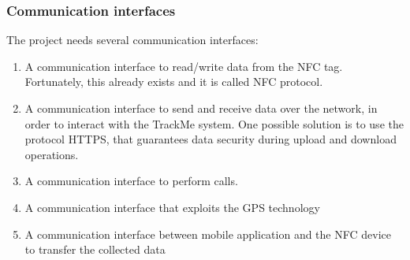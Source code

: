 \subsubsection{Communication interfaces} 
The project needs several communication interfaces:
\begin{enumerate}
\item A communication interface to read/write data from the NFC tag. Fortunately, this already exists and it is called NFC protocol.
\item A communication interface to send and receive data over the network, in order to interact with the TrackMe system. One possible solution is to use the protocol HTTPS, that guarantees data security during upload and download operations. 
\item A communication interface to perform calls. 
\item A communication interface that exploits the GPS technology
\item A communication interface between mobile application and the NFC device to transfer the collected data
\end{enumerate} 
